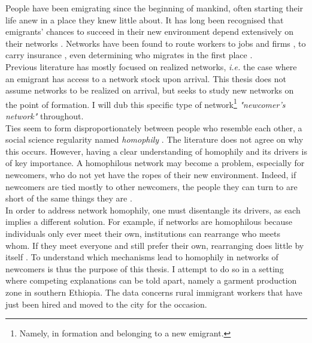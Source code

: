 \noindent People have been emigrating since the beginning of mankind, often starting their life anew in a place they knew little about. It has long been recognised that emigrants' chances to succeed in their new environment depend extensively on their networks \citep{munshi2003networks}. Networks have been found to route workers to jobs and firms \citep{calvo2004effects, beaman2012social}, to carry insurance \citep{townsend1994risk, fafchamps2007formation, ambrus2014consumption}, even determining who migrates in the first place \citep{munshi2016networks, morten2019temporary}. \\

\noindent Previous literature has mostly focused on realized networks, \textit{i.e.} the case where an emigrant has access to a network stock upon arrival. This thesis does not assume networks to be realized on arrival, but seeks to study new networks on the point of formation. I will dub this specific type of network\footnote{Namely, in formation and belonging to a new emigrant.} \textit{"newcomer's network"} throughout. \\

\noindent Ties seem to form disproportionately between people who resemble each other, a social science regularity named \textit{homophily} \citep{mcpherson2001birds}. The literature does not agree on why this occurs. However, having a clear understanding of homophily and its drivers is of key importance. A homophilous network may become a problem, especially for newcomers, who do not yet have the ropes of their new environment. Indeed, if newcomers are tied mostly to other newcomers, the people they can turn to are short of the same things they are \citep{beaman2012social}. \\

\noindent In order to address network homophily, one must disentangle its drivers, as each implies a different solution. For example, if networks are homophilous because individuals only ever meet their own, institutions can rearrange who meets whom. If they meet everyone and still prefer their own, rearranging does little by itself \citep{lowe2021types}. To understand which mechanisms lead to homophily in networks of newcomers is thus the purpose of this thesis. I attempt to do so in a setting where competing explanations can be told apart, namely a garment production zone in southern Ethiopia. The data concerns rural immigrant workers that have just been hired and moved to the city for the occasion.  \\

